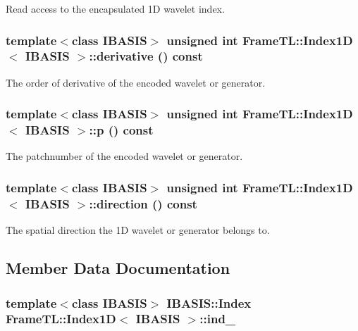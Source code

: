 Read access to the encapsulated 1D wavelet index. \hypertarget{classFrameTL_1_1Index1D_46d0d42aec593b2e95c9b5c9d52c8996}{
\subsubsection[derivative]{\setlength{\rightskip}{0pt plus 5cm}template$<$class IBASIS$>$ unsigned int {\bf FrameTL::Index1D}$<$ IBASIS $>$::derivative () const}}
\label{classFrameTL_1_1Index1D_46d0d42aec593b2e95c9b5c9d52c8996}


The order of derivative of the encoded wavelet or generator. \hypertarget{classFrameTL_1_1Index1D_81891e5fbcc38d52ac67b79f31fbe4e9}{
\subsubsection[p]{\setlength{\rightskip}{0pt plus 5cm}template$<$class IBASIS$>$ unsigned int {\bf FrameTL::Index1D}$<$ IBASIS $>$::p () const}}
\label{classFrameTL_1_1Index1D_81891e5fbcc38d52ac67b79f31fbe4e9}


The patchnumber of the encoded wavelet or generator. \hypertarget{classFrameTL_1_1Index1D_6b15c805cffc08a4c241b6343573fe0a}{
\subsubsection[direction]{\setlength{\rightskip}{0pt plus 5cm}template$<$class IBASIS$>$ unsigned int {\bf FrameTL::Index1D}$<$ IBASIS $>$::direction () const}}
\label{classFrameTL_1_1Index1D_6b15c805cffc08a4c241b6343573fe0a}


The spatial direction the 1D wavelet or generator belongs to. 

\subsection{Member Data Documentation}
\hypertarget{classFrameTL_1_1Index1D_b6de25bfbba40ba29cb649ee96c8e3dd}{
\subsubsection[ind\_\-]{\setlength{\rightskip}{0pt plus 5cm}template$<$class IBASIS$>$ IBASIS::Index {\bf FrameTL::Index1D}$<$ IBASIS $>$::{\bf ind\_\-}}}
\label{classFrameTL_1_1Index1D_b6de25bfbba40ba29cb649ee96c8e3dd}


